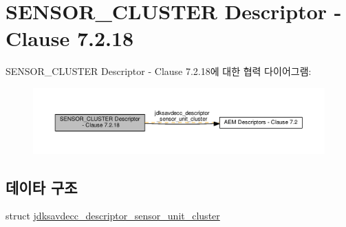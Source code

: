 \hypertarget{group__descriptor__sensor__cluster}{}\section{S\+E\+N\+S\+O\+R\+\_\+\+C\+L\+U\+S\+T\+ER Descriptor -\/ Clause 7.2.18}
\label{group__descriptor__sensor__cluster}
S\+E\+N\+S\+O\+R\+\_\+\+C\+L\+U\+S\+T\+ER Descriptor -\/ Clause 7.2.18에 대한 협력 다이어그램\+:
\nopagebreak
\begin{figure}[H]
\begin{center}
\leavevmode
\includegraphics[width=350pt]{group__descriptor__sensor__cluster}
\end{center}
\end{figure}
\subsection*{데이타 구조}
\begin{DoxyCompactItemize}
\item 
struct \hyperlink{structjdksavdecc__descriptor__sensor__unit__cluster}{jdksavdecc\+\_\+descriptor\+\_\+sensor\+\_\+unit\+\_\+cluster}
\end{DoxyCompactItemize}
